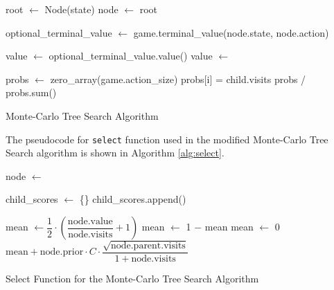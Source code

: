 \begin{algorithm}[htb]
    \begin{algorithmic}[1]
            \State root $\gets$ Node(state)
                \State node $\gets$ root
        
        
                \State optional\_terminal\_value $\gets$ game.terminal\_value(node.state, node.action)
                
                    \State value $\gets$ optional\_terminal\_value.value()
                \Else
                    \State value $\gets$ 
                \EndIf
        
                \State {}
            \EndFor

            \State probs $\gets$ zero\_array(game.action\_size)
                \State probs[i] = child.visits
            \EndFor
            \State \Return probs / probs.sum()
        \EndFunction
    \end{algorithmic}
    \caption{Monte-Carlo Tree Search Algorithm}
    \label{alg:mcts}
\end{algorithm}

The pseudocode for \verb|select| function used in the modified Monte-Carlo Tree Search algorithm is shown in Algorithm \ref{alg:select}.

\begin{algorithm}[htb]
    \begin{algorithmic}[1]
                \State node $\gets$ 
            \EndWhile
        \EndFunction
        
            \State child\_scores $\gets$ \{\}
                \State child\_scores.append()
            \EndFor
            \Return {}
        \EndFunction
        
                \State mean $\gets \dfrac{1}{2}\cdot\left(\dfrac{ \text{node.value} }{ \text{node.visits} } + 1\right)$
                    \State mean $\gets$ 1 $-$ mean
                \EndIf
            \Else
                \State mean $\gets$ 0
            \EndIf
            \State \Return $\text{mean} + \text{node.prior} \cdot C \cdot \dfrac{\sqrt{\text{node.parent.visits}}}{1 + \text{node.visits}}$  
        \EndFunction
    \end{algorithmic}
    \caption{Select Function for the Monte-Carlo Tree Search Algorithm}
    \label{alg:select}
\end{algorithm}

